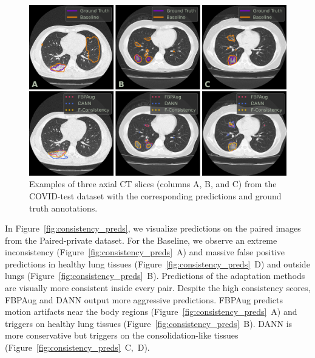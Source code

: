 \begin{figure}[h]
	\centering
	\includegraphics[width=\textwidth]{Dissertation/Figures/3_ct/test_preds.png}
	\caption{Examples of three axial CT slices (columns A, B, and C) from the COVID-test dataset with the corresponding predictions and ground truth annotations.}%
	\label{fig:test_preds}
\end{figure}

In Figure~\ref{fig:consistency_preds}, we visualize predictions on the paired images from the Paired-private dataset. For the Baseline, we observe an extreme inconsistency (Figure~\ref{fig:consistency_preds}~A) and massive false positive predictions in healthy lung tissues (Figure~\ref{fig:consistency_preds}~D) and outside lungs (Figure~\ref{fig:consistency_preds}~B). Predictions of the adaptation methods are visually more consistent inside every pair. Despite the high consistency scores, FBPAug and DANN output more aggressive predictions. FBPAug predicts motion artifacts near the body regions (Figure~\ref{fig:consistency_preds}~A) and triggers on healthy lung tissues (Figure~\ref{fig:consistency_preds}~B). DANN is more conservative but triggers on the consolidation-like tissues (Figure~\ref{fig:consistency_preds}~C,~D).%

